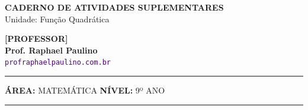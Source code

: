 
\usepackage{titlesec}
\titleformat{\section}{\color{black}\large\bfseries}{\thesection}{0em}{\vspace{0.1cm}\titlerule[0.8pt]}
\titlespacing*{\section}{0pt}{10pt}{6pt} 
\titleformat{\subsubsection}[runin]{\color{black}\bfseries}{}{0em}{}
\titlespacing*{\subsubsection}{0pt}{0pt}{0.15cm}

\usepackage{multicol}
\setlength{\columnsep}{1cm}
\setlength{\columnseprule}{0.5pt}
\def\columnseprulecolor{\color{CorLinha}}
\usepackage{adjustbox, tikz, pgfplots, circuitikz}
\usetikzlibrary{shadows, shapes.misc, positioning, calc}
\pgfplotsset{compat=1.18}


\thispagestyle{empty}
\color{Cinzablack}
\vspace*{-1.8cm}

\noindent
\begin{minipage}{\textwidth}
    \selectfont
    \noindent
    \begin{minipage}[t]{0.65\linewidth}
        {\Large \bfseries \MakeUppercase{Caderno de Atividades Suplementares}}\\[0.1cm]
        {\large \textmd{\textcolor{CinzaEscuro}{Unidade: Função Quadrática}}}
    \end{minipage}%
    \begin{minipage}[t]{0.35\linewidth}
        \raggedleft
        \ifgabarito
            {\large \bfseries \textcolor{CorTitUm}{[PROFESSOR]}}\\[0.05cm]
        \fi
        \small \textbf{Prof. Raphael Paulino}\\
        \textsf{\small \textcolor{indigo}{\texttt{profraphaelpaulino.com.br}}}
    \end{minipage}
    
    \vspace{0.15cm}
    \noindent\rule{\linewidth}{1.2pt}
    \vspace{-0.1cm}
    \footnotesize\textsf{\textbf{ÁREA:} MATEMÁTICA \hfill \textbf{NÍVEL:} 9º ANO}
    \vspace{0.1cm}
    \noindent\rule{\linewidth}{0.4pt}
\end{minipage}

